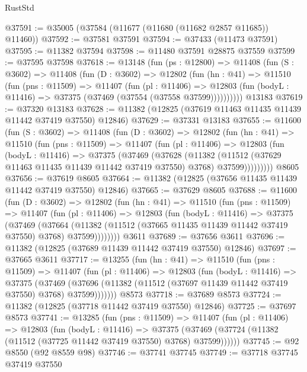 \begin{lexlean}{RustStd}
\begin{coremodule}
@37591 := @35005 (@37584 (@11677 (@11680 (@11682 @2857 @11685)) @11460))
@37592 := @37581 @37591
@37594 := @37433 (@11473 @37591)
@37595 := @11382 @37594
@37598 := @11480 @37591 @28875 @37559
@37599 := @37595 @37598
@37618 := @13148
    (fun (ps : @12800) =>
    @11408
      (fun (S : @3602) =>
      @11408
        (fun (D : @3602) =>
        @12802
          (fun (hn : @41) =>
          @11510
            (fun (pns : @11509) =>
            @11407
              (fun (pl : @11406) =>
              @12803 (fun (bodyL : @11416) => @37375 (@37469 (@37554 (@37558 @37599))))))))))
    @13183
@37619 := @37320 @13183
@37628 := @11382 (@12825 (@37619 @11463 @11435 @11439 @11442 @37419 @37550) @12846)
@37629 := @37331 @13183
@37655 := @11600
    (fun (S : @3602) =>
    @11408
      (fun (D : @3602) =>
      @12802
        (fun (hn : @41) =>
        @11510
          (fun (pns : @11509) =>
          @11407
            (fun (pl : @11406) =>
            @12803
              (fun (bodyL : @11416) =>
              @37375
                (@37469
                  (@37628
                    (@11382
                      (@11512 (@37629 @11463 @11435 @11439 @11442 @37419 @37550) @3768)
                      @37599)))))))))
    @8605
@37656 := @37619 @8605
@37664 := @11382 (@12825 (@37656 @11435 @11439 @11442 @37419 @37550) @12846)
@37665 := @37629 @8605
@37688 := @11600
    (fun (D : @3602) =>
    @12802
      (fun (hn : @41) =>
      @11510
        (fun (pns : @11509) =>
        @11407
          (fun (pl : @11406) =>
          @12803
            (fun (bodyL : @11416) =>
            @37375
              (@37469
                (@37664
                  (@11382 (@11512 (@37665 @11435 @11439 @11442 @37419 @37550) @3768) @37599))))))))
    @3611
@37689 := @37656 @3611
@37696 := @11382 (@12825 (@37689 @11439 @11442 @37419 @37550) @12846)
@37697 := @37665 @3611
@37717 := @13255
    (fun (hn : @41) =>
    @11510
      (fun (pns : @11509) =>
      @11407
        (fun (pl : @11406) =>
        @12803
          (fun (bodyL : @11416) =>
          @37375
            (@37469
              (@37696 (@11382 (@11512 (@37697 @11439 @11442 @37419 @37550) @3768) @37599)))))))
    @8573
@37718 := @37689 @8573
@37724 := @11382 (@12825 (@37718 @11442 @37419 @37550) @12846)
@37725 := @37697 @8573
@37741 := @13285
    (fun (pns : @11509) =>
    @11407
      (fun (pl : @11406) =>
      @12803
        (fun (bodyL : @11416) =>
        @37375 (@37469 (@37724 (@11382 (@11512 (@37725 @11442 @37419 @37550) @3768) @37599))))))
@37745 := @92 @8550 (@92 @8559 @98)
@37746 := @37741 @37745
@37749 := @37718 @37745 @37419 @37550

\end{coremodule}
\end{lexlean}
